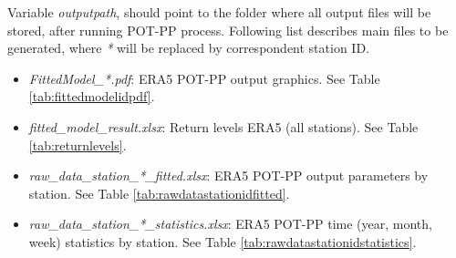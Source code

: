 \documentclass[12pt,oneside]{reedthesis}
\providecommand{\tightlist}{%
  \setlength{\itemsep}{0pt}\setlength{\parskip}{0pt}}
\begin{document}
Variable \emph{outputpath}, should point to the folder where all output files will be stored, after running POT-PP process. Following list describes main files to be generated, where \emph{*} will be replaced by correspondent station ID.
\begin{itemize}
\tightlist
\item
  \emph{FittedModel\_*.pdf}: ERA5 POT-PP output graphics. See Table \ref{tab:fittedmodelidpdf}.
\item
  \emph{fitted\_model\_result.xlsx}: Return levels ERA5 (all stations). See Table \ref{tab:returnlevels}.
\item
  \emph{raw\_data\_station\_*\_fitted.xlsx}: ERA5 POT-PP output parameters by station. See Table \ref{tab:rawdatastationidfitted}.
\item
  \emph{raw\_data\_station\_*\_statistics.xlsx}: ERA5 POT-PP time (year, month, week) statistics by station. See Table \ref{tab:rawdatastationidstatistics}.
\end{itemize}
\begingroup\fontsize{8}{10}\selectfont
\end{document}
